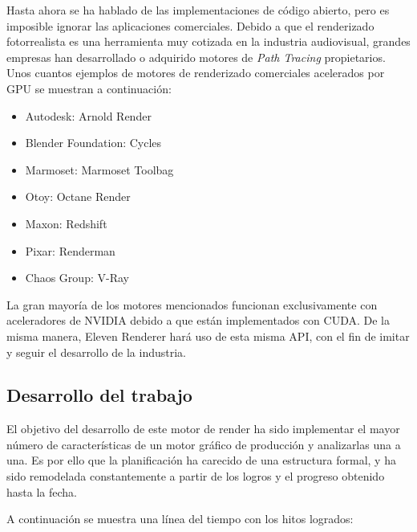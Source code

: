 Hasta ahora se ha hablado de las implementaciones de código abierto, pero es imposible ignorar las aplicaciones comerciales. Debido a que el renderizado fotorrealista es una herramienta muy cotizada en la industria audiovisual, grandes empresas han desarrollado o adquirido motores de \emph{Path Tracing} propietarios. Unos cuantos ejemplos de motores de renderizado comerciales acelerados por GPU se muestran a continuación:

\begin{itemize}

\item Autodesk: Arnold Render
\item Blender Foundation: Cycles
\item Marmoset: Marmoset Toolbag
\item Otoy: Octane Render
\item Maxon: Redshift
\item Pixar: Renderman
\item Chaos Group: V-Ray

\end{itemize}

La gran mayoría de los motores mencionados funcionan exclusivamente con aceleradores de NVIDIA debido a que están implementados con CUDA. De la misma manera, Eleven Renderer hará uso de esta misma API, con el fin de imitar y seguir el desarrollo de la industria.

\subsection{Desarrollo del trabajo}
	
El objetivo del desarrollo de este motor de render ha sido implementar el mayor número de características de un motor gráfico de producción y analizarlas una a una. Es por ello que la planificación ha carecido de una estructura formal, y ha sido remodelada constantemente a partir de los logros y el progreso obtenido hasta la fecha.

A continuación se muestra una línea del tiempo con los hitos logrados:	

